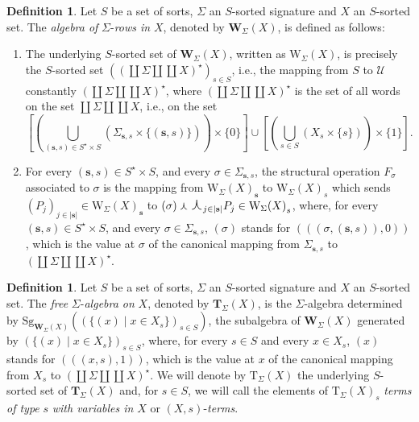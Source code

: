\documentclass[a4paper, reqno
]{amsart}
\newcommand{\concat}{\ensuremath{\text{\Large $\curlywedge$}}}
\newcommand{\bb}[1]{\ensuremath{\lvert #1 \rvert}}
\theoremstyle{plain}
\theoremstyle{definition}
\newtheorem{definition}[theorem]{Definition}
\begin{document}
\begin{definition}\label{DRows}
Let $S$ be a set of sorts, $\Sigma$ an $S$-sorted signature and $X$ an $S$-sorted set.
The \emph{algebra of} $\Sigma$-\emph{rows in} $X$, denoted by $\mathbf{W}_{\Sigma}(X)$, is defined as follows:
\begin{enumerate}
\item The underlying $S$-sorted set of $\mathbf{W}_{\Sigma}(X)$, written as $\mathrm{W}_{\Sigma}(X)$, is precisely the $S$-sorted set $((\coprod\Sigma \amalg \coprod X)^{\star})_{s\in S}$, i.e., the mapping from $S$ to $\boldsymbol{\mathcal{U}}$ constantly $(\coprod\Sigma \amalg \coprod X)^{\star}$, where $(\coprod\Sigma \amalg \coprod X)^{\star}$ is the set of all words on the set $\coprod\Sigma \amalg \coprod X$, i.e., on the set
      $$
      \textstyle
      [(\bigcup_{(\mathbf{s},s)\in S^{\star}\times S}(\Sigma_{\mathbf{s},s}\times\{(\mathbf{s},s)\}))\times\{0\}]\cup
      [(\bigcup_{s\in S}(X_{s}\times\{s\}))\times\{1\}].
      $$
\item For every $(\mathbf{s},s)\in S^{\star}\times S$, and every $\sigma\in\Sigma_{\mathbf{s},s}$, the structural operation $F_{\sigma}$ associated to $\sigma$ is the mapping from $\mathrm{W}_{\Sigma}(X)_{\mathbf{s}}$ to ${\mathrm{W}_{\Sigma}(X)}_{s}$ which sends $(P_{j})_{j\in\bb{\mathbf{s}}} \in \mathrm{W}_{\Sigma}(X)_{\mathbf{s}}$ to $(\sigma)\curlywedge\concat_{j\in\bb{\mathbf{s}}}P_{j} \in {\mathrm{W}_{\Sigma}(X)}_{s}$, where, for every $(\mathbf{s},s)\in S^{\star}\times S$, and every $\sigma\in\Sigma_{\mathbf{s},s}$, $(\sigma)$ stands for $(((\sigma,(\mathbf{s},s)),0))$, which is the value at $\sigma$ of the canonical mapping from $\Sigma_{\mathbf{s},s}$ to $(\coprod\Sigma \amalg \coprod X)^{\star}$.
\end{enumerate}
\end{definition}

\begin{definition}\label{DAlgFree}
Let $S$ be a set of sorts, $\Sigma$ an $S$-sorted signature and $X$ an $S$-sorted set.
The \emph{free} $\Sigma$-\emph{algebra on} $X$, denoted by $\mathbf{T}_{\Sigma}(X)$, is the $\Sigma$-algebra determined by $\mathrm{Sg}_{\mathbf{W}_{\Sigma}(X)}((\{(x)\mid x\in X_{s}\})_{s\in S})$, the subalgebra of $\mathbf{W}_{\Sigma}(X)$ generated by $(\{(x)\mid x\in X_{s}\})_{s\in S}$, where, for every $s\in S$ and every $x\in X_{s}$, $(x)$ stands for $(((x,s),1))$, which is the value at $x$ of the canonical mapping from $X_{s}$ to $(\coprod\Sigma \amalg \coprod X)^{\star}$.
We will denote by $\mathrm{T}_{\Sigma}(X)$ the underlying $S$-sorted set of $\mathbf{T}_{\Sigma}(X)$ and, for $s\in S$, we will call the elements of $\mathrm{T}_{\Sigma}(X)_{s}$ \emph{terms of type} $s$ \emph{with variables in} $X$ or $(X,s)$-\emph{terms}.
\end{definition}
\end{document}
